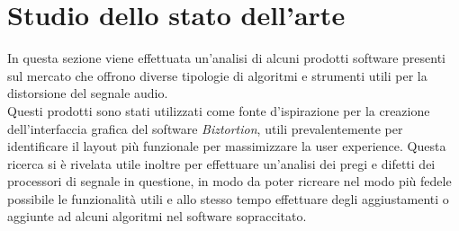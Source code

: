 \section{Studio dello stato dell'arte}
In questa sezione viene effettuata un'analisi di alcuni prodotti software presenti sul mercato che offrono diverse tipologie di algoritmi e strumenti utili per la distorsione del segnale audio. \\
Questi prodotti sono stati utilizzati come fonte d'ispirazione per la creazione dell'interfaccia grafica del software \textit{Biztortion}, utili prevalentemente per identificare il layout più funzionale per massimizzare la user experience. Questa ricerca si è rivelata utile inoltre per effettuare un'analisi dei pregi e difetti dei processori di segnale in questione, in modo da poter ricreare nel modo più fedele possibile le funzionalità utili e allo stesso tempo effettuare degli aggiustamenti o aggiunte ad alcuni algoritmi nel software sopraccitato.

